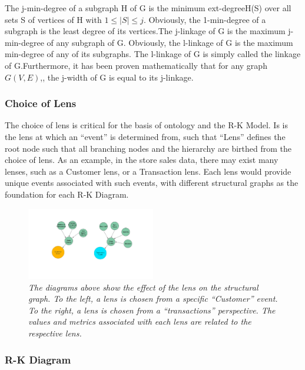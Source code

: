 The j-min-degree of a subgraph H of G is the minimum ext-degreeH(S) over all sets S of vertices of H with $1 \le |S| \le j$. Obviously, the 1-min-degree of a subgraph is the least degree of its vertices.The j-linkage of G is the maximum j-min-degree of any subgraph of G. Obviously, the l-linkage of G is the maximum min-degree of any of its subgraphs. The l-linkage of G is simply called the linkage of G.Furthermore, it has been proven mathematically that for any graph $G(V, E)$,, the j-width of G is equal to its j-linkage.

\subsubsection{Choice of Lens}
\label{sec:sectionlens}

The choice of lens is critical for the basis of ontology and the R-K Model. Is is the lens at which an ``event'' is determined from, such that ``Lens'' defines the root node such that all branching nodes and the hierarchy are birthed from the choice of lens. As an example, in the store sales data, there may exist many lenses, such as a Customer lens, or a Transaction lens. Each lens would provide unique events associated with such events, with different structural graphs as the foundation for each R-K Diagram.

\begin{figure}
	\centering
        \includegraphics[width=0.5\textwidth]{images/Lens_Choice2.jpg}
	\caption{\textit{The diagrams above show the effect of the lens on the structural graph. To the left, a lens is chosen from a specific ``Customer'' event. To the right, a lens is chosen from a ``transactions'' perspective. The values and metrics associated with each lens are related to the respective lens. }}
	\label{fig:Lens_Choice}
\end{figure}

\subsubsection{R-K Diagram}
\label{subsec:R-K Diagram}

